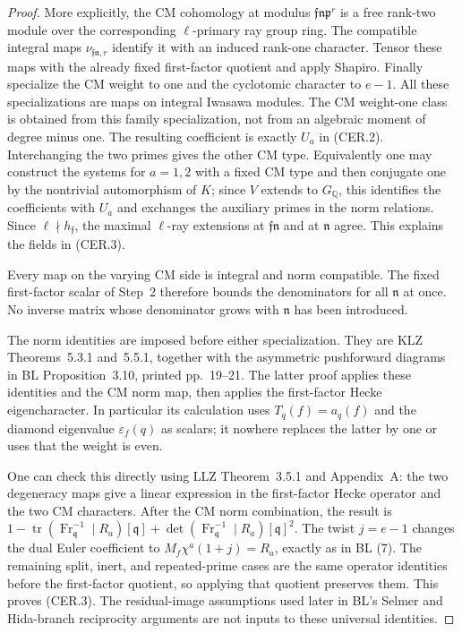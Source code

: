 \begin{proof}
More explicitly, the CM cohomology at modulus
$\mathfrak f\mathfrak n\mathfrak p^r$ is a free rank-two
module over the corresponding $\ell$-primary ray group ring.
The compatible integral maps $\nu_{\mathfrak f\mathfrak n,r}$
identify it with an induced rank-one character.  Tensor these
maps with the already fixed first-factor quotient and apply
Shapiro.  Finally specialize the CM weight to one and the
cyclotomic character to $e-1$.  All these specializations are
maps on integral Iwasawa modules.  The CM weight-one class is
obtained from this family specialization, not from an
algebraic moment of degree minus one.  The resulting
coefficient is exactly $U_a$ in (CER.2).  Interchanging the
two primes gives the other CM type.  Equivalently one may
construct the systems for $a=1,2$ with a fixed CM type and
then conjugate one by the nontrivial automorphism of $K$;
since $V$ extends to $G_{\mathbb Q}$, this identifies the
coefficients with $U_a$ and exchanges the auxiliary primes
in the norm relations.
Since $\ell\nmid h_{\mathfrak f}$, the maximal
$\ell$-ray extensions at $\mathfrak f\mathfrak n$ and at
$\mathfrak n$ agree.  This explains the fields in (CER.3).

Every map on the varying CM side is integral and norm
compatible.  The fixed first-factor scalar of Step~2
therefore bounds the denominators for all $\mathfrak n$ at
once.  No inverse matrix whose denominator grows with
$\mathfrak n$ has been introduced.

The norm identities are imposed before either specialization.
They are KLZ Theorems~5.3.1 and~5.5.1, together with the
asymmetric pushforward diagrams in BL Proposition~3.10,
printed pp.~19--21.  The latter proof applies these identities
and the CM norm map, then applies the first-factor Hecke
eigencharacter.  In particular its calculation uses
$T_q(f)=a_q(f)$ and the diamond eigenvalue
$\varepsilon_f(q)$ as scalars; it nowhere replaces the latter
by one or uses that the weight is even.

One can check this directly using LLZ Theorem~3.5.1 and
Appendix~A: the two degeneracy maps give a linear expression
in the first-factor Hecke operator and the two CM characters.
After the CM norm combination, the result is
$1-\operatorname{tr}(\operatorname{Fr}_{\mathfrak q}^{-1}
\mid R_a)[\mathfrak q]
+\det(\operatorname{Fr}_{\mathfrak q}^{-1}
\mid R_a)[\mathfrak q]^2$.
The twist $j=e-1$ changes the dual Euler coefficient to
$M_f\chi^a(1+j)=R_a$, exactly as in BL (7).
The remaining split, inert, and repeated-prime cases are
the same operator identities before the first-factor
quotient, so applying that quotient preserves them.
This proves (CER.3).  The residual-image assumptions used
later in BL's Selmer and Hida-branch reciprocity arguments
are not inputs to these universal identities.


\end{proof}
